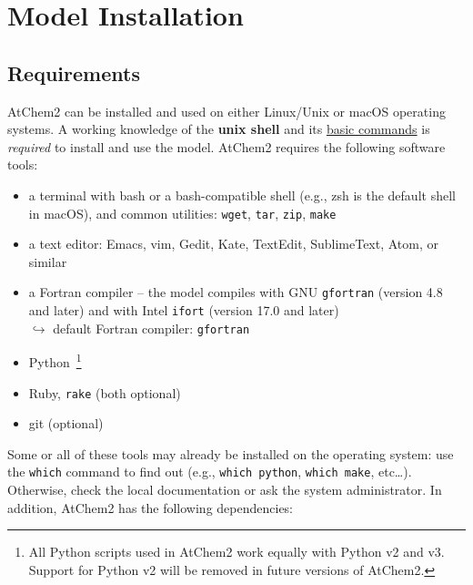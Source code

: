 %
%
%
%

\chapter{Model Installation} \label{ch:installation}

\section{Requirements} \label{sec:requirements}

AtChem2 can be installed and used on either Linux/Unix or macOS
operating systems. A working knowledge of the \textbf{unix shell} and
its \href{https://swcarpentry.github.io/shell-novice}{basic commands}
is \emph{required} to install and use the model. AtChem2 requires the
following software tools:

\begin{itemize}
\item a terminal with bash or a bash-compatible shell (e.g., zsh is
  the default shell in macOS), and common utilities: \texttt{wget},
  \texttt{tar}, \texttt{zip}, \texttt{make}
\item a text editor: Emacs, vim, Gedit, Kate, TextEdit, SublimeText,
  Atom, or similar
\item a Fortran compiler -- the model compiles with GNU \texttt{gfortran}
  (version 4.8 and later) and with Intel \texttt{ifort} (version 17.0 and later)\\
  $\hookrightarrow$ default Fortran compiler: \texttt{gfortran}
\item Python~\footnote{All Python scripts used in AtChem2 work equally
    with Python v2 and v3. Support for Python v2 will be removed in
    future versions of AtChem2.}
\item Ruby, \texttt{rake} (both optional)
\item git (optional)
\end{itemize}

Some or all of these tools may already be installed on the operating
system: use the \texttt{which} command to find out (e.g.,
\verb|which python|, \verb|which make|, etc\ldots). Otherwise, check
the local documentation or ask the system administrator. In addition,
AtChem2 has the following dependencies:

